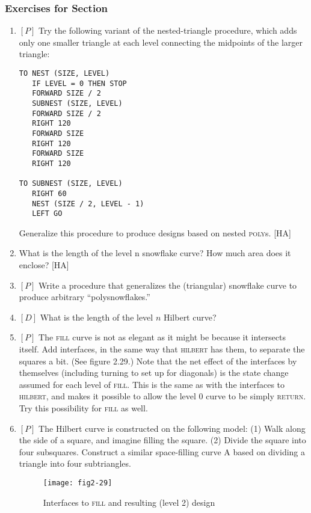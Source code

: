 \documentclass{book}
\begin{document}
\subsubsection{Exercises for Section \thesection}

\begin{enumerate}
\item $[P]$ Try the following variant of the nested-triangle procedure, which
adds only one smaller triangle at each level connecting the midpoints of
the larger triangle:

\begin{verbatim}
TO NEST (SIZE, LEVEL)
   IF LEVEL = 0 THEN STOP
   FORWARD SIZE / 2
   SUBNEST (SIZE, LEVEL)
   FORWARD SIZE / 2
   RIGHT 120
   FORWARD SIZE
   RIGHT 120
   FORWARD SIZE
   RIGHT 120

TO SUBNEST (SIZE, LEVEL)
   RIGHT 60
   NEST (SIZE / 2, LEVEL - 1)
   LEFT GO
\end{verbatim}
Generalize this procedure to produce designs based on nested \textsc{poly}s.
[HA]
\item What is the length of the level n snowflake curve? How much area
does it enclose? [HA]
\item $[P]$ Write a procedure that generalizes the (triangular) snowflake curve
to produce arbitrary ``polysnowflakes.''
\item $[D]$ What is the length of the level $n$ Hilbert curve?  
\item $[P]$ The \textsc{fill} curve is not as elegant as it might be because it intersects
itself. Add interfaces, in the same way that \textsc{hilbert} has them, to
separate the squares a bit. (See figure 2.29.) Note that the net effect of
the interfaces by themselves (including turning to set up for diagonals)
is the state change assumed for each level of \textsc{fill}. This is the same as
with the interfaces to \textsc{hilbert}, and makes it possible to allow the level
0 curve to be simply \textsc{return}. Try this possibility for \textsc{fill} as well.
\item $[P]$ The Hilbert curve is constructed on the following model: (1) Walk
along the side of a square, and imagine filling the square. (2) Divide
the square into four subsquares. Construct a similar space-filling curve
A based on dividing a triangle into four subtriangles.

\begin{figure}
\begin{center}
\texttt{[image: fig2-29]}
\caption{Interfaces to \textsc{fill} and resulting (level 2) design}
\end{center}
\end{figure}


\end{enumerate}
\end{document}
